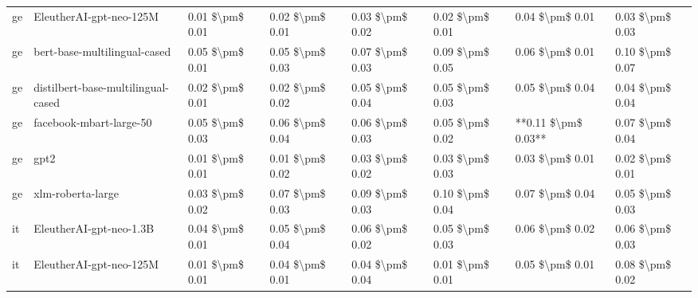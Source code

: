 \begin{tabular}{llllllll}
      ge &            EleutherAI-gpt-neo-125M & 0.01 \$\textbackslash pm\$ 0.01 &           0.02 \$\textbackslash pm\$ 0.01 &       0.03 \$\textbackslash pm\$ 0.02 &        0.02 \$\textbackslash pm\$ 0.01 &                         0.04 \$\textbackslash pm\$ 0.01 &     0.03 \$\textbackslash pm\$ 0.03 \\
      ge &       bert-base-multilingual-cased & 0.05 \$\textbackslash pm\$ 0.01 &           0.05 \$\textbackslash pm\$ 0.03 &       0.07 \$\textbackslash pm\$ 0.03 &        0.09 \$\textbackslash pm\$ 0.05 &                         0.06 \$\textbackslash pm\$ 0.01 &     0.10 \$\textbackslash pm\$ 0.07 \\
      ge & distilbert-base-multilingual-cased & 0.02 \$\textbackslash pm\$ 0.01 &           0.02 \$\textbackslash pm\$ 0.02 &       0.05 \$\textbackslash pm\$ 0.04 &        0.05 \$\textbackslash pm\$ 0.03 &                         0.05 \$\textbackslash pm\$ 0.04 &     0.04 \$\textbackslash pm\$ 0.04 \\
      ge &            facebook-mbart-large-50 & 0.05 \$\textbackslash pm\$ 0.03 &           0.06 \$\textbackslash pm\$ 0.04 &       0.06 \$\textbackslash pm\$ 0.03 &        0.05 \$\textbackslash pm\$ 0.02 &                     **0.11 \$\textbackslash pm\$ 0.03** &     0.07 \$\textbackslash pm\$ 0.04 \\
      ge &                               gpt2 & 0.01 \$\textbackslash pm\$ 0.01 &           0.01 \$\textbackslash pm\$ 0.02 &       0.03 \$\textbackslash pm\$ 0.02 &        0.03 \$\textbackslash pm\$ 0.03 &                         0.03 \$\textbackslash pm\$ 0.01 &     0.02 \$\textbackslash pm\$ 0.01 \\
      ge &                  xlm-roberta-large & 0.03 \$\textbackslash pm\$ 0.02 &           0.07 \$\textbackslash pm\$ 0.03 &       0.09 \$\textbackslash pm\$ 0.03 &        0.10 \$\textbackslash pm\$ 0.04 &                         0.07 \$\textbackslash pm\$ 0.04 &     0.05 \$\textbackslash pm\$ 0.03 \\
      it &            EleutherAI-gpt-neo-1.3B & 0.04 \$\textbackslash pm\$ 0.01 &           0.05 \$\textbackslash pm\$ 0.04 &       0.06 \$\textbackslash pm\$ 0.02 &        0.05 \$\textbackslash pm\$ 0.03 &                         0.06 \$\textbackslash pm\$ 0.02 &     0.06 \$\textbackslash pm\$ 0.03 \\
      it &            EleutherAI-gpt-neo-125M & 0.01 \$\textbackslash pm\$ 0.01 &           0.04 \$\textbackslash pm\$ 0.01 &       0.04 \$\textbackslash pm\$ 0.04 &        0.01 \$\textbackslash pm\$ 0.01 &                         0.05 \$\textbackslash pm\$ 0.01 &     0.08 \$\textbackslash pm\$ 0.02 \\

\end{tabular}
